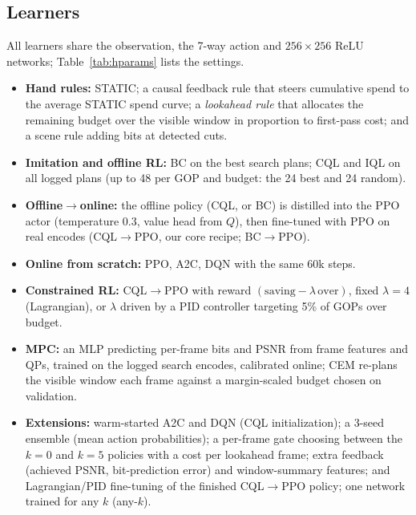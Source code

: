 \documentclass[conference]{IEEEtran}
\newcommand{\cqlppo}{CQL$\to$PPO}
\newcommand{\bcppo}{BC$\to$PPO}
\begin{document}
\subsection{Learners}
All learners share the observation, the 7-way action and $256{\times}256$ ReLU networks; Table~\ref{tab:hparams} lists the settings.
\begin{itemize}
\item \textbf{Hand rules:} STATIC; a causal feedback rule that steers cumulative spend to the average STATIC spend curve; a \emph{lookahead rule} that allocates the remaining budget over the visible window in proportion to first-pass cost; and a scene rule adding bits at detected cuts.
\item \textbf{Imitation and offline RL:} BC on the best search plans; CQL and IQL on all logged plans (up to 48 per GOP and budget: the 24 best and 24 random).
\item \textbf{Offline$\to$online:} the offline policy (CQL, or BC) is distilled into the PPO actor (temperature 0.3, value head from $Q$), then fine-tuned with PPO on real encodes (\cqlppo, our core recipe; \bcppo).
\item \textbf{Online from scratch:} PPO, A2C, DQN with the same 60k steps.
\item \textbf{Constrained RL:} \cqlppo{} with reward $(\text{saving} - \lambda\,\text{over})$, fixed $\lambda{=}4$ (Lagrangian), or $\lambda$ driven by a PID controller targeting 5\% of GOPs over budget.
\item \textbf{MPC:} an MLP predicting per-frame bits and PSNR from frame features and QPs, trained on the logged search encodes, calibrated online; CEM re-plans the visible window each frame against a margin-scaled budget chosen on validation.
\item \textbf{Extensions:} warm-started A2C and DQN (CQL initialization); a 3-seed ensemble (mean action probabilities); a per-frame gate choosing between the $k{=}0$ and $k{=}5$ policies with a cost per lookahead frame; extra feedback (achieved PSNR, bit-prediction error) and window-summary features; and Lagrangian/PID fine-tuning of the finished \cqlppo{} policy; one network trained for any $k$ (any-$k$).
\end{itemize}
\end{document}
